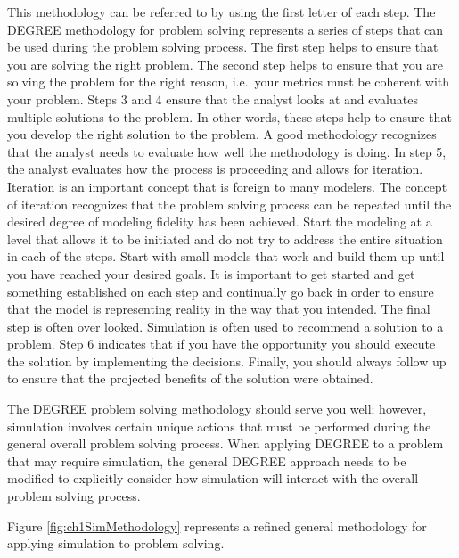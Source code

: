 \documentclass[
]{book}
\theoremstyle{definition}
\theoremstyle{definition}
\theoremstyle{definition}
\theoremstyle{definition}
\theoremstyle{remark}
\begin{document}
This methodology can be referred to by using the first letter of each
step. The DEGREE methodology for problem solving represents a series of
steps that can be used during the problem solving process. The first
step helps to ensure that you are solving the right problem. The second
step helps to ensure that you are solving the problem for the right
reason, i.e.~your metrics must be coherent with your problem. Steps 3
and 4 ensure that the analyst looks at and evaluates multiple solutions
to the problem. In other words, these steps help to ensure that you
develop the right solution to the problem. A good methodology recognizes
that the analyst needs to evaluate how well the methodology is doing. In
step 5, the analyst evaluates how the process is proceeding and allows
for iteration. Iteration is an important concept that is foreign to many
modelers. The concept of iteration recognizes that the problem solving
process can be repeated until the desired degree of modeling fidelity
has been achieved. Start the modeling at a level that allows it to be
initiated and do not try to address the entire situation in each of the
steps. Start with small models that work and build them up until you
have reached your desired goals. It is important to get started and get
something established on each step and continually go back in order to
ensure that the model is representing reality in the way that you
intended. The final step is often over looked. Simulation is often used
to recommend a solution to a problem. Step 6 indicates that if you have
the opportunity you should execute the solution by implementing the
decisions. Finally, you should always follow up to ensure that the
projected benefits of the solution were obtained.

The DEGREE problem solving methodology should serve you well; however,
simulation involves certain unique actions that must be performed during
the general overall problem solving process. When applying DEGREE to a
problem that may require simulation, the general DEGREE approach needs
to be modified to explicitly consider how simulation will interact with
the overall problem solving process.

Figure \ref{fig:ch1SimMethodology} represents a refined general
methodology for applying simulation to problem solving.
\end{document}

